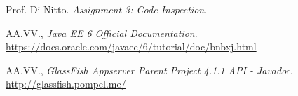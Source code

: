 \documentclass[a4paper, 11pt]{article}
\begin{document}
\appendix

\clearpage
{}

\begin{thebibliography}{9}
 Prof. Di Nitto.
\emph{Assignment 3: Code Inspection}.

 AA.VV.,
\emph{Java EE 6 Official Documentation}.
\url{https://docs.oracle.com/javaee/6/tutorial/doc/bnbxj.html}

 AA.VV.,
\emph{GlassFish Appserver Parent Project 4.1.1 API - Javadoc}.
\url{http://glassfish.pompel.me/}
\end{thebibliography}
\end{document}

